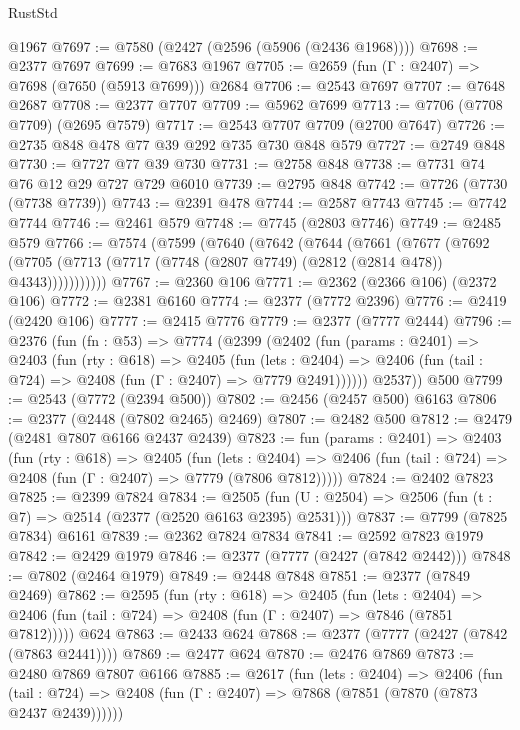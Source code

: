\begin{lexlean}{RustStd}
\begin{coremodule}
    @1967
@7697 := @7580 (@2427 (@2596 (@5906 (@2436 @1968))))
@7698 := @2377 @7697
@7699 := @7683 @1967
@7705 := @2659 (fun (Γ : @2407) => @7698 (@7650 (@5913 @7699))) @2684
@7706 := @2543 @7697
@7707 := @7648 @2687
@7708 := @2377 @7707
@7709 := @5962 @7699
@7713 := @7706 (@7708 @7709) (@2695 @7579)
@7717 := @2543 @7707 @7709 (@2700 @7647)
@7726 := @2735 @848 @478 @77 @39 @292 @735 @730 @848 @579
@7727 := @2749 @848
@7730 := @7727 @77 @39 @730
@7731 := @2758 @848
@7738 := @7731 @74 @76 @12 @29 @727 @729 @6010
@7739 := @2795 @848
@7742 := @7726 (@7730 (@7738 @7739))
@7743 := @2391 @478
@7744 := @2587 @7743
@7745 := @7742 @7744
@7746 := @2461 @579
@7748 := @7745 (@2803 @7746)
@7749 := @2485 @579
@7766 := @7574
    (@7599
      (@7640
        (@7642
          (@7644
            (@7661
              (@7677
                (@7692
                  (@7705 (@7713 (@7717 (@7748 (@2807 @7749) (@2812 (@2814 @478)) @4343)))))))))))
@7767 := @2360 @106
@7771 := @2362 (@2366 @106) (@2372 @106)
@7772 := @2381 @6160
@7774 := @2377 (@7772 @2396)
@7776 := @2419 (@2420 @106)
@7777 := @2415 @7776
@7779 := @2377 (@7777 @2444)
@7796 := @2376
    (fun (fn : @53) =>
    @7774
      (@2399
        (@2402
          (fun (params : @2401) =>
          @2403
            (fun (rty : @618) =>
            @2405
              (fun (lets : @2404) =>
              @2406 (fun (tail : @724) => @2408 (fun (Γ : @2407) => @7779 @2491))))))
        @2537))
    @500
@7799 := @2543 (@7772 (@2394 @500))
@7802 := @2456 (@2457 @500) @6163
@7806 := @2377 (@2448 (@7802 @2465) @2469)
@7807 := @2482 @500
@7812 := @2479 (@2481 @7807 @6166 @2437 @2439)
@7823 := fun (params : @2401) =>
  @2403
    (fun (rty : @618) =>
    @2405
      (fun (lets : @2404) =>
      @2406 (fun (tail : @724) => @2408 (fun (Γ : @2407) => @7779 (@7806 @7812)))))
@7824 := @2402 @7823
@7825 := @2399 @7824
@7834 := @2505 (fun (U : @2504) => @2506 (fun (t : @7) => @2514 (@2377 (@2520 @6163 @2395) @2531)))
@7837 := @7799 (@7825 @7834) @6161
@7839 := @2362 @7824 @7834
@7841 := @2592 @7823 @1979
@7842 := @2429 @1979
@7846 := @2377 (@7777 (@2427 (@7842 @2442)))
@7848 := @7802 (@2464 @1979)
@7849 := @2448 @7848
@7851 := @2377 (@7849 @2469)
@7862 := @2595
    (fun (rty : @618) =>
    @2405
      (fun (lets : @2404) =>
      @2406 (fun (tail : @724) => @2408 (fun (Γ : @2407) => @7846 (@7851 @7812)))))
    @624
@7863 := @2433 @624
@7868 := @2377 (@7777 (@2427 (@7842 (@7863 @2441))))
@7869 := @2477 @624
@7870 := @2476 @7869
@7873 := @2480 @7869 @7807 @6166
@7885 := @2617
    (fun (lets : @2404) =>
    @2406
      (fun (tail : @724) => @2408 (fun (Γ : @2407) => @7868 (@7851 (@7870 (@7873 @2437 @2439))))))

\end{coremodule}
\end{lexlean}
